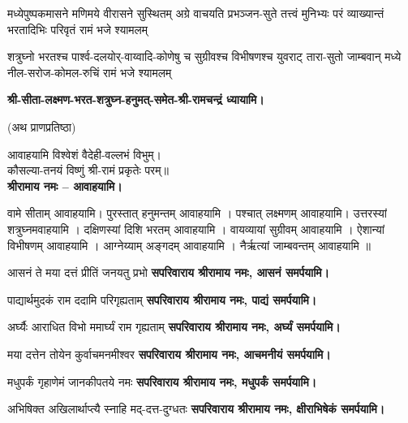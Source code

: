 \begin{center}

\renewcommand{\devAya}{सपरिवाराय श्रीरामाय नमः,}

{मध्येपुष्पकमासने मणिमये वीरासने सुस्थितम्}
{अग्रे वाचयति प्रभञ्जन-सुते तत्त्वं मुनिभ्यः परं}
{व्याख्यान्तं भरतादिभिः परिवृतं रामं भजे श्यामलम्}

{शत्रुघ्नो भरतश्च पार्श्व-दलयोर्-वाय्वादि-कोणेषु च}
{सुग्रीवश्च विभीषणश्च युवराट् तारा-सुतो जाम्बवान्}
{मध्ये नील-सरोज-कोमल-रुचिं रामं भजे श्यामलम्}

\textbf{श्री-सीता-लक्ष्मण-भरत-शत्रुघ्न-हनुमत्-समेत-श्री-रामचन्द्रं ध्यायामि।}

(अथ प्राणप्रतिष्ठा)


आवाहयामि विश्वेशं वैदेही-वल्लभं विभुम्।\\
कौसल्या-तनयं विष्णुं श्री-रामं प्रकृतेः परम्॥\\
\textbf{श्रीरामाय नमः – आवाहयामि।}

वामे सीताम् आवाहयामि।
पुरस्तात् हनुमन्तम् आवाहयामि ।
पश्चात् लक्ष्मणम् आवाहयामि।
उत्तरस्यां शत्रुघ्नमवाहयामि ।
दक्षिणस्यां दिशि भरतम् आवाहयामि ।
वायव्यायां सुग्रीवम् आवाहयामि ।
ऐशान्यां विभीषणम् आवाहयामि ।
आग्नेय्याम् अङ्गदम् आवाहयामि ।
नैर्ऋत्यां जाम्बवन्तम् आवाहयामि ॥

{आसनं ते मया दत्तं प्रीतिं जनयतु प्रभो}
\textbf{\devAya{} आसनं समर्पयामि।\\}

{पाद्यार्थमुदकं राम ददामि परिगृह्यताम्}
\textbf{\devAya{} पाद्यं समर्पयामि।\\}

{अर्घ्यैः आराधित विभो ममार्घ्यं राम गृह्यताम्}
\textbf{\devAya{} अर्घ्यं समर्पयामि।\\}

{मया दत्तेन तोयेन कुर्वाचमनमीश्वर}
\textbf{\devAya{} आचमनीयं समर्पयामि।\\}

{मधुपर्कं गृहाणेमं जानकीपतये नमः}
\textbf{\devAya{} मधुपर्कं समर्पयामि।\\}

{अभिषिक्त अखिलार्थाप्त्यै स्नाहि मद्-दत्त-दुग्धतः}
\textbf{\devAya{} क्षीराभिषेकं समर्पयामि।\\}


\end{center}
